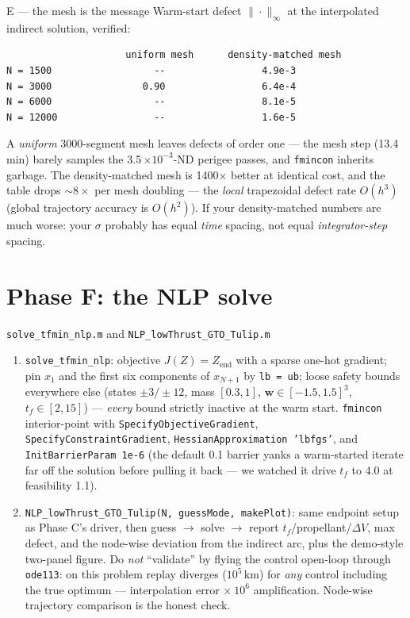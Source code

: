 \documentclass[11pt,letterpaper]{article}
\begin{document}
\begin{checkpoint}{E --- the mesh is the message}
Warm-start defect $\|\cdot\|_\infty$ at the interpolated indirect
solution, verified:
\begin{verbatim}
                     uniform mesh      density-matched mesh
N = 1500                  --                 4.9e-3
N = 3000                0.90                 6.4e-4
N = 6000                  --                 8.1e-5
N = 12000                 --                 1.6e-5
\end{verbatim}
A \emph{uniform} 3000-segment mesh leaves defects of order one --- the
mesh step (13.4\,min) barely samples the 3.5\,$\times 10^{-3}$-ND perigee
passes, and \texttt{fmincon} inherits garbage. The density-matched mesh is
1400$\times$ better at identical cost, and the table drops $\sim 8\times$
per mesh doubling --- the \emph{local} trapezoidal defect rate $O(h^3)$
(global trajectory accuracy is $O(h^2)$). If your density-matched numbers
are much worse: your $\sigma$ probably has equal \emph{time} spacing, not
equal \emph{integrator-step} spacing.
\end{checkpoint}

\section{Phase F: the NLP solve}

\begin{exercise}{\texttt{solve\_tfmin\_nlp.m} and
\texttt{NLP\_lowThrust\_GTO\_Tulip.m}}
\begin{enumerate}[leftmargin=1.5em,nosep]
\item \texttt{solve\_tfmin\_nlp}: objective $J(Z) = Z_{\text{end}}$ with a
      sparse one-hot gradient; pin $x_1$ and the first six components of
      $x_{N+1}$ by \texttt{lb = ub}; loose safety bounds everywhere else
      (states $\pm 3/\pm 12$, mass $[0.3, 1]$, $\mathbf w \in
      [-1.5,1.5]^3$, $t_f \in [2, 15]$) --- \emph{every} bound strictly
      inactive at the warm start. \texttt{fmincon} interior-point with
      \texttt{SpecifyObjectiveGradient}, \texttt{SpecifyConstraintGradient},
      \texttt{HessianApproximation 'lbfgs'}, and
      \texttt{InitBarrierParam 1e-6} (the default 0.1 barrier yanks a
      warm-started iterate far off the solution before pulling it back ---
      we watched it drive $t_f$ to 4.0 at feasibility 1.1).
\item \texttt{NLP\_lowThrust\_GTO\_Tulip(N, guessMode, makePlot)}: same
      endpoint setup as Phase C's driver, then guess $\to$ solve $\to$
      report $t_f$/propellant/$\Delta V$, max defect, and the node-wise
      deviation from the indirect arc, plus the demo-style two-panel
      figure. Do \emph{not} ``validate'' by flying the control open-loop
      through \texttt{ode113}: on this problem replay diverges ($10^5$\,km)
      for \emph{any} control including the true optimum --- interpolation
      error $\times\ 10^6$ amplification. Node-wise trajectory comparison
      is the honest check.
\end{enumerate}
\end{exercise}
\end{document}
